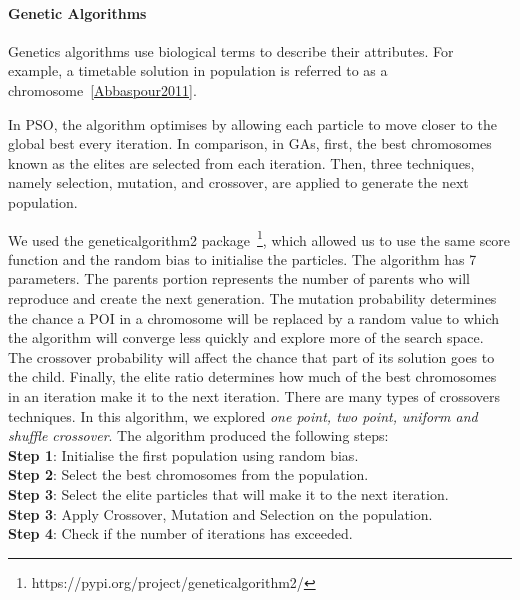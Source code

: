 \paragraph{Genetic Algorithms}

Genetics algorithms use biological terms to describe
their attributes. For example, a timetable solution in
population is referred to as a chromosome~\ref{Abbaspour2011}. 

In PSO, the algorithm optimises by allowing each
particle to move closer to the global best every
iteration. In comparison, in GAs, first, the best
chromosomes known as the elites are selected from each
iteration. Then, three techniques, namely selection,
mutation, and crossover, are applied to generate the
next population.

We used the geneticalgorithm2 package~\footnote{https://pypi.org/project/geneticalgorithm2/},
which allowed us to use the same score function and
the random bias to initialise the particles. The
algorithm has 7 parameters. The parents portion
represents the number of parents who will reproduce
and create the next generation. The mutation
probability determines the chance a POI in a
chromosome will be replaced by a random value to which
the algorithm will converge less quickly and explore
more of the search space. The crossover probability
will affect the chance that part of its solution goes
to the child. Finally, the elite ratio determines how
much of the best chromosomes in an iteration make it
to the next iteration.  There are many types of
crossovers techniques. In this algorithm, we
explored \textit{one point, two point, uniform and shuffle crossover}.  The algorithm produced the following
steps: \\
\textbf{Step 1}: Initialise the first population using random bias. \\
\textbf{Step 2}: Select the best chromosomes from the population. \\ 
\textbf{Step 3}: Select the elite particles that will make it to the next iteration.\\
\textbf{Step 3}: Apply Crossover, Mutation and Selection on the population. \\
\textbf{Step 4}: Check if the number of iterations has exceeded. 


